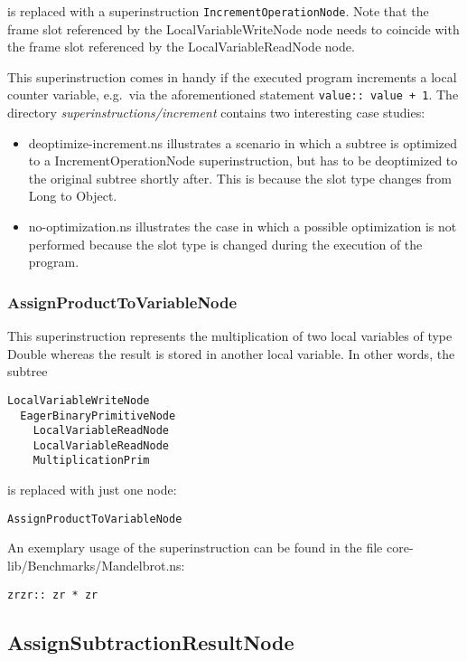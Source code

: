 \documentclass[10pt,a4paper]{article}
\begin{document}
is replaced with a superinstruction \verb|IncrementOperationNode|. Note that the frame slot referenced by the \textsf{LocalVariableWriteNode} node needs to coincide with the frame slot referenced by the \textsf{LocalVariableReadNode} node.

This superinstruction comes in handy if the executed program increments a local counter variable, e.g.\ via the aforementioned statement \verb|value:: value + 1|. The directory \emph{superinstructions/increment} contains two interesting case studies:

\begin{itemize}
	\item \textsf{deoptimize-increment.ns} illustrates a scenario in which a subtree is optimized to a \textsf{IncrementOperationNode} superinstruction, but has to be deoptimized to the original subtree shortly after. This is because the slot type changes from \textsf{Long} to \textsf{Object}.
	\item \textsf{no-optimization.ns} illustrates the case in which a possible optimization is not performed because the slot type is changed during the execution of the program.
\end{itemize}

\subsubsection{AssignProductToVariableNode}

This superinstruction represents the multiplication of two local variables of type \textsf{Double} whereas the result is stored in another local variable. In other words, the subtree

\begin{verbatim}
LocalVariableWriteNode
  EagerBinaryPrimitiveNode
    LocalVariableReadNode
    LocalVariableReadNode
    MultiplicationPrim
\end{verbatim}
is replaced with just one node:
\begin{verbatim}
AssignProductToVariableNode
\end{verbatim}
An exemplary usage of the superinstruction can be found in the file \textsf{core-lib/Benchmarks/Mandelbrot.ns}:
\begin{verbatim}
zrzr:: zr * zr
\end{verbatim}

\subsection{AssignSubtractionResultNode}
\end{document}
